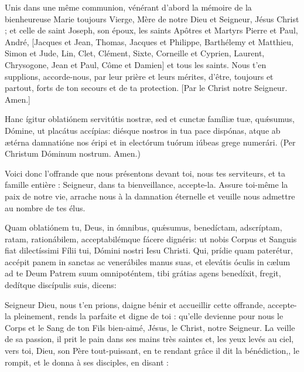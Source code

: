 \documentclass[twoside]{article}
\begin{document}
\begin{paracol}{2}
\switchcolumn

Unis dans une même communion, vénérant d’abord la mémoire de la bienheureuse Marie toujours Vierge, Mère de notre Dieu et Seigneur, Jésus Christ ; et celle de saint Joseph, son époux, les saints Apôtres et Martyrs Pierre et Paul, André, [Jacques et Jean, Thomas, Jacques et Philippe, Barthélemy et Matthieu, Simon et Jude, Lin, Clet, Clément, Sixte, Corneille et Cyprien, Laurent, Chrysogone, Jean et Paul, Côme et Damien] et tous les saints.
Nous t'en supplions, accorde-nous, par leur prière et leurs mérites, d'être, toujours et partout, forts de ton secours et de ta protection. [Par le Christ notre Seigneur. Amen.]

\switchcolumn*

Hanc ígitur oblatiónem servitútis nostræ,
sed et cunctæ famíliæ tuæ,
quǽsumus, Dómine, ut placátus accípias:
diésque nostros in tua pace dispónas,
atque ab ætérna damnatióne nos éripi
et in electórum tuórum iúbeas grege numerári.
(Per Christum Dóminum nostrum. Amen.)

\switchcolumn

Voici donc l’offrande que nous présentons devant toi, nous tes serviteurs, et ta famille entière : 
Seigneur, dans ta bienveillance, accepte-la.
Assure toi-même la paix de notre vie, arrache nous à la damnation éternelle et veuille nous admettre au nombre de tes élus. 

\switchcolumn*

Quam oblatiónem tu, Deus, in ómnibus, quǽsumus,
benedíctam, adscríptam, ratam,
rationábilem, acceptabilémque fácere dignéris:
ut nobis Corpus et Sanguis fiat dilectíssimi Fílii tui,
Dómini nostri Iesu Christi. 
Qui, prídie quam paterétur, 
accépit panem in sanctas ac venerábiles manus suas,
et elevátis óculis in cælum
ad te Deum Patrem suum omnipoténtem,
tibi grátias agens benedíxit,
fregit,
dedítque discípulis suis, dicens: 

\switchcolumn

Seigneur Dieu, nous t’en prions, daigne bénir et accueillir cette offrande, accepte-la pleinement, 
rends la parfaite et digne de toi : qu’elle devienne pour nous le Corps et le Sang de ton Fils bien-aimé,
Jésus, le Christ, notre Seigneur. 
La veille de sa passion, il prit le pain dans ses mains très saintes et, les yeux levés au ciel, vers toi, Dieu, son Père tout-puissant, en te rendant grâce il dit la bénédiction,, le rompit, et le donna à ses disciples, en disant :

\switchcolumn*


\end{paracol}
\end{document}
